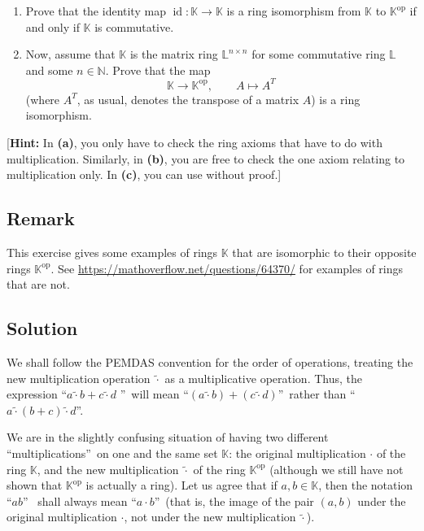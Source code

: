 \documentclass[paper=a4, fontsize=12pt]{scrartcl}%
\theoremstyle{plainsl}
\theoremstyle{definition}
\theoremstyle{remark}
\begin{document}
\begin{enumerate}
\item[\textbf{(b)}] Prove that the identity map $\operatorname{id} :
\mathbb{K} \to\mathbb{K}$ is a ring isomorphism from $\mathbb{K}$ to
$\mathbb{K}^{\operatorname{op}}$ if and only if $\mathbb{K}$ is commutative.

\item[\textbf{(c)}] Now, assume that $\mathbb{K}$ is the matrix ring
$\mathbb{L}^{n \times n}$ for some commutative ring $\mathbb{L}$ and some $n
\in\mathbb{N}$. Prove that the map
\[
\mathbb{K} \to\mathbb{K}^{\operatorname{op}}, \qquad A \mapsto A^{T}
\]
(where $A^{T}$, as usual, denotes the transpose of a matrix $A$) is a ring isomorphism.
\end{enumerate}

[\textbf{Hint:} In \textbf{(a)}, you only have to check the ring axioms that
have to do with multiplication. Similarly, in \textbf{(b)}, you are free to
check the one axiom relating to multiplication only. In \textbf{(c)}, you can
use \cite[Exercise 6.5]{detnotes} without proof.]

\subsection{Remark}

This exercise gives some examples of rings $\mathbb{K}$ that are isomorphic to
their opposite rings $\mathbb{K}^{\operatorname{op}}$. See
\url{https://mathoverflow.net/questions/64370/} for examples of rings that are not.

\subsection{Solution}

We shall follow the PEMDAS convention for the order of operations, treating
the new multiplication operation $\left.  \widetilde{\cdot}\right.  $ as a
multiplicative operation. Thus, the expression \textquotedblleft$a\left.
\widetilde{\cdot}\right.  b+c\left.  \widetilde{\cdot}\right.  d$%
\textquotedblright\ will mean \textquotedblleft$\left(  a\left.
\widetilde{\cdot}\right.  b\right)  +\left(  c\left.  \widetilde{\cdot
}\right.  d\right)  $\textquotedblright\ rather than \textquotedblleft%
$a\left.  \widetilde{\cdot}\right.  \left(  b+c\right)  \left.
\widetilde{\cdot}\right.  d$\textquotedblright.

We are in the slightly confusing situation of having two different
\textquotedblleft multiplications\textquotedblright\ on one and the same set
$\mathbb{K}$: the original multiplication $\cdot$ of the ring $\mathbb{K}$,
and the new multiplication $\left.  \widetilde{\cdot}\right.  $ of the ring
$\mathbb{K}^{\operatorname*{op}}$ (although we still have not shown that
$\mathbb{K}^{\operatorname*{op}}$ is actually a ring). Let us agree that if
$a,b\in\mathbb{K}$, then the notation \textquotedblleft$ab$\textquotedblright%
\ shall always mean \textquotedblleft$a\cdot b$\textquotedblright\ (that is,
the image of the pair $\left(  a,b\right)  $ under the original multiplication
$\cdot$, not under the new multiplication $\left.  \widetilde{\cdot}\right.  $).
\end{document}
